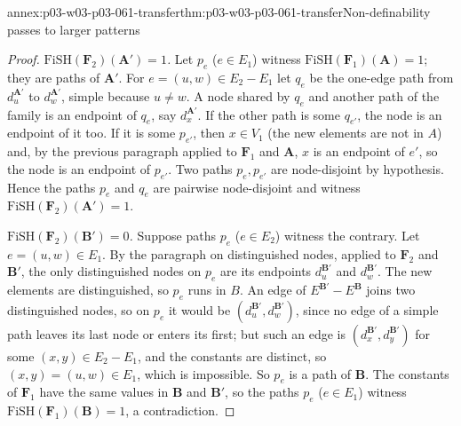 \begin{annexitem}{annex:p03-w03-p03-061-transfer}{thm:p03-w03-p03-061-transfer}{Non-definability passes to larger patterns}
\begin{proof}
\emph{\(\mathrm{FiSH}(\mathbf F_2)(\mathbf A')=1\).} Let \(p_e\)
(\(e\in E_1\)) witness \(\mathrm{FiSH}(\mathbf F_1)(\mathbf A)=1\); they are
paths of \(\mathbf A'\). For \(e=(u,w)\in E_2-E_1\) let \(q_e\) be the
one-edge path from \(d_u^{\mathbf A'}\) to \(d_w^{\mathbf A'}\), simple
because \(u\neq w\). A node shared by \(q_e\) and another path of the family
is an endpoint of \(q_e\), say \(d_x^{\mathbf A'}\). If the other path is
some \(q_{e'}\), the node is an endpoint of it too. If it is some
\(p_{e'}\), then \(x\in V_1\) (the new elements are not in \(A\)) and, by
the previous paragraph applied to \(\mathbf F_1\) and \(\mathbf A\), \(x\) is
an endpoint of \(e'\), so the node is an endpoint of \(p_{e'}\). Two paths
\(p_e,p_{e'}\) are node-disjoint by hypothesis. Hence the paths \(p_e\) and
\(q_e\) are pairwise node-disjoint and witness
\(\mathrm{FiSH}(\mathbf F_2)(\mathbf A')=1\).

\emph{\(\mathrm{FiSH}(\mathbf F_2)(\mathbf B')=0\).} Suppose paths \(p_e\)
(\(e\in E_2\)) witness the contrary. Let \(e=(u,w)\in E_1\). By the
paragraph on distinguished nodes, applied to \(\mathbf F_2\) and
\(\mathbf B'\), the only distinguished nodes on \(p_e\) are its endpoints
\(d_u^{\mathbf B'}\) and \(d_w^{\mathbf B'}\). The new elements are
distinguished, so \(p_e\) runs in \(B\). An edge of
\(E^{\mathbf B'}-E^{\mathbf B}\) joins two distinguished nodes, so on
\(p_e\) it would be \((d_u^{\mathbf B'},d_w^{\mathbf B'})\), since no edge of
a simple path leaves its last node or enters its first; but such an edge is
\((d_x^{\mathbf B'},d_y^{\mathbf B'})\) for some \((x,y)\in E_2-E_1\), and the
constants are distinct, so \((x,y)=(u,w)\in E_1\), which is impossible. So
\(p_e\) is a path of \(\mathbf B\). The constants of \(\mathbf F_1\) have the
same values in \(\mathbf B\) and \(\mathbf B'\), so the paths \(p_e\)
(\(e\in E_1\)) witness \(\mathrm{FiSH}(\mathbf F_1)(\mathbf B)=1\), a
contradiction.


\end{proof}
\end{annexitem}

